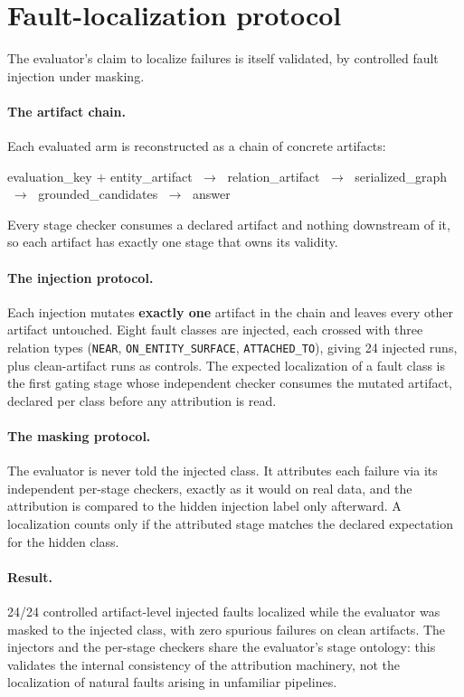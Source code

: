 \section{Fault-localization protocol}
\label{ssec:faults}

The evaluator's claim to localize failures is itself validated, by
controlled fault injection under masking.

\paragraph{The artifact chain.} Each evaluated arm is reconstructed as a
chain of concrete artifacts:
\begin{center}\footnotesize
  evaluation\_key $+$ entity\_artifact $\;\rightarrow\;$ relation\_artifact
  $\;\rightarrow\;$ serialized\_graph $\;\rightarrow\;$ grounded\_candidates
  $\;\rightarrow\;$ answer
\end{center}
Every stage checker consumes a declared artifact and nothing downstream of
it, so each artifact has exactly one stage that owns its validity.

\paragraph{The injection protocol.} Each injection mutates \textbf{exactly
one} artifact in the chain and leaves every other artifact untouched. Eight
fault classes are injected, each crossed with three relation types
(\texttt{NEAR}, \texttt{ON\_ENTITY\_SURFACE}, \texttt{ATTACHED\_TO}), giving
24 injected runs, plus clean-artifact runs as controls. The expected
localization of a fault class is the first gating stage whose independent
checker consumes the mutated artifact, declared per class before any
attribution is read.

\paragraph{The masking protocol.} The evaluator is never told the injected
class. It attributes each failure via its independent per-stage checkers,
exactly as it would on real data, and the attribution is compared to the
hidden injection label only afterward. A localization counts only if the
attributed stage matches the declared expectation for the hidden class.

\paragraph{Result.} 24/24 controlled artifact-level injected faults
localized while the evaluator was masked to the injected class, with zero
spurious failures on clean artifacts. The injectors and the per-stage
checkers share the evaluator's stage ontology: this validates the internal
consistency of the attribution machinery, not the localization of natural
faults arising in unfamiliar pipelines.

